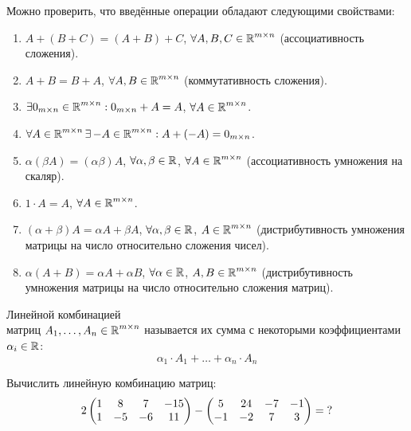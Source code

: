 \documentclass[a4paper,12pt]{article}
\begin{document}
  \begin{remark}
    Можно проверить, что введённые операции обладают следующими свойствами:
    \begin{enumerate}
      \item $A + (B + C) = (A + B) + C$, $\forall A, B, C \in \operatorname{\mathbb R}^{m \times n}$ (ассоциативность сложения).
      \item $A + B = B + A$, $\forall A, B \in \operatorname{\mathbb R}^{m \times n}$ (коммутативность сложения).
      \item $\exists 0_{m\times n} \in \operatorname{\mathbb R}^{m \times n}: 0_{m\times n} + A = A$, $\forall A \hm\in \RR^{m \times n}$.
      \item $\forall A \in \operatorname{\mathbb R}^{m \times n} \exists\, {-A} \in \operatorname{\mathbb R}^{m \times n}: A + ({-A}) = 0_{m\times n}$.
      \item $\alpha (\beta A) = (\alpha \beta) A$, $\forall \alpha, \beta \in \operatorname{\mathbb R}$, $\forall A \hm\in \RR^{m \times n}$ (ассоциативность умножения на скаляр).
      \item $1 \cdot A = A$, $\forall A \in \operatorname{\mathbb R}^{m \times n}$.
      \item $(\alpha + \beta) A = \alpha A + \beta A$, $\forall \alpha, \beta \hm\in \RR$, $A \hm\in \RR^{m \times n}$ (дистрибутивность умножения матрицы на число относительно сложения чисел).
      \item $\alpha (A + B) = \alpha A + \alpha B$, $\forall \alpha \hm\in \RR$, $A, B \hm\in \RR^{m \times n}$ (дистрибутивность умножения матрицы на число относительно сложения матриц).
    \end{enumerate}
  \end{remark}
  
  \begin{definition}
    Линейной комбинацией\\матриц $A_1, \ldots, A_n \hm\in \RR^{m \times n}$ называется их сумма с некоторыми коэффициентами $\alpha_i \hm\in \RR$:  %
    \[
      \alpha_1 \cdot A_1 + \ldots + \alpha_n \cdot A_n
    \]
  \end{definition}
  
  
  \begin{problem}[15.2(3)]
    Вычислить линейную комбинацию матриц:
    \[
      2 \begin{pmatrix}
        1 & 8 & 7 & -15\\
        1 & -5 & -6 & 11
      \end{pmatrix}
      - \begin{pmatrix}
        5 & 24 & -7 & -1\\
        -1 & -2 & 7 & 3
      \end{pmatrix} = \operatorname{?}
    \]
  \end{problem}
  
\end{document}
